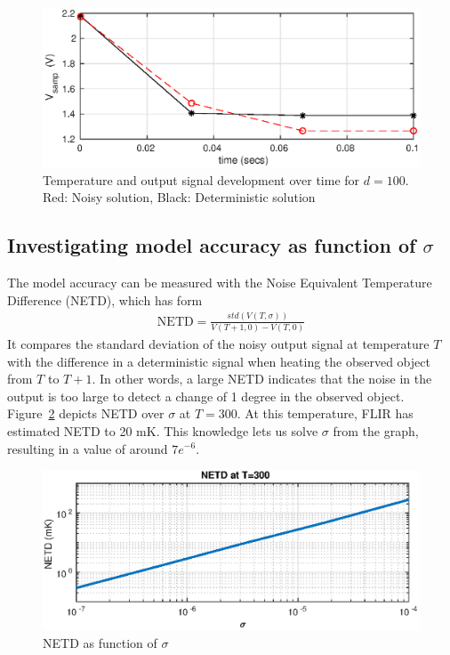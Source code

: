 \begin{figure}
\includegraphics[scale=0.9]{gfx/Vout_several_pulses_noise.eps} 
\caption{Temperature and output signal development over time for $d=100$. Red: Noisy solution, Black: Deterministic solution}
\label{fig:noisysol}
\end{figure}




\subsection{Investigating model accuracy as function of $\sigma$}
The model accuracy can be measured with the Noise Equivalent Temperature Difference (NETD), which has form
\begin{align}
\mbox{NETD} = \frac{std(V(T, \sigma))}{V(T+1,0)-V(T,0)}
\end{align}
It compares the standard deviation of the noisy output signal at temperature $T$ with the difference in a deterministic signal when heating the observed object 
from $T$ to $T+1$. In other words, a large NETD indicates that the noise in the output is too large to detect a change of 1 degree in the observed object.
Figure~\ref{fig:NETD_over_sigma} depicts NETD over $\sigma$ at $T=300$. At this temperature, FLIR has estimated NETD to 20 mK. 
This knowledge lets us solve $\sigma$ from the graph, resulting in a value of around $7e^{-6}$.
\begin{figure}[H]
 \begin{center}
\includegraphics[scale=0.9]{gfx/NETD_as_function_of_sigma.eps} 	 
  \caption{NETD as function of $\sigma$}
  \label{fig:NETD_over_sigma}
  \end{center}
\end{figure}

